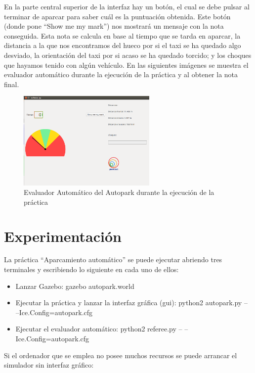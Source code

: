 En la parte central superior de la interfaz hay un botón, el cual se debe pulsar al terminar de aparcar para saber cuál es la puntuación obtenida. Este botón (donde pone ``Show me my mark'') nos mostrará un mensaje con la nota conseguida. Esta nota se calcula en base al tiempo que se tarda en aparcar, la distancia a la que nos encontramos del hueco por si el taxi se ha quedado algo desviado, la orientación del taxi por si acaso se ha quedado torcido; y los choques que hayamos tenido con algún vehículo. En las siguientes imágenes se muestra el evaluador automático durante la ejecución de la práctica y al obtener la nota final.

\begin{figure}[H]
  \begin{center}
    \includegraphics[width=0.6\textwidth]{figures/Autopark/Referee_DurantePractica.png}
		\caption{Evaluador Automático del Autopark durante la ejecución de la práctica}
		\label{fig.Referee_DurantePractica}
		\end{center}
\end{figure}


\section{Experimentación}
La práctica “Aparcamiento automático” se puede ejecutar abriendo tres terminales y escribiendo lo siguiente en cada uno de ellos:

\begin{itemize}
\item Lanzar Gazebo: gazebo autopark.world
\item	Ejecutar la práctica y lanzar la interfaz gráfica (\acrshort{gui}): python2 autopark.py -- --Ice.Config=autopark.cfg
\item	Ejecutar el evaluador automático: python2 referee.py -- --Ice.Config=autopark.cfg
\end{itemize}

Si el ordenador que se emplea no posee muchos recursos se puede arrancar el simulador sin interfaz gráfico:

